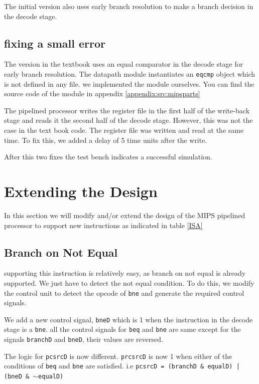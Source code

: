 \documentclass[titlepage,12pt,oneside,a4paper]{article}
\newcommand{\code}[1]{{\texttt{#1}}}
\begin{document}
The initial version also uses early branch resolution to make a branch decision in the decode stage.

\subsection{fixing a small error}

The version in the textbook uses an equal comparator in the decode stage for early branch resolution. The datapath module instantiates an \code{eqcmp} object which is not defined in any file. we implemented the module ourselves. You can find the source code of the module in appendix \ref{appendix:src:mipsparts}

The pipelined processor writes the register file in the first half of the write-back stage and reads it the second half of the decode stage. However, this was not the case in the text book code. The register file was written and read at the same time. To fix this, we added a delay of 5 time units after the write.

After this two fixes the test bench indicates a successful simulation.

\section{Extending the Design}

In this section we will modify and/or extend the design of the MIPS pipelined processor to support new instructions as indicated in table \ref{ISA}

\subsection{Branch on Not Equal}
supporting this instruction is relatively easy, as branch on not equal is already supported. We just have to detect the not equal condition. To do this, we modify the control unit to detect the opcode of \code{bne} and generate the required control signals.

We add a new control signal, \code{bneD} which is 1 when the instruction in the decode stage is a \code{bne}. all the control signals for \code{beq} and \code{bne} are same except for the signals \code{branchD} and \code{bneD}, their values are reversed. 

The logic for \code{pcsrcD} is now different. \code{prcsrcD} is now 1 when either of the conditions of \code{beq} and \code{bne} are satisfied. i.e \code{pcsrcD = (branchD \& equalD) | (bneD \& $\sim$equalD)}
\end{document}
